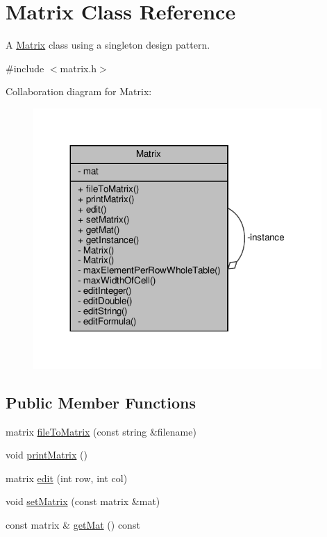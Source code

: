 \hypertarget{class_matrix}{}\section{Matrix Class Reference}
\label{class_matrix}


A \hyperlink{class_matrix}{Matrix} class using a singleton design pattern.  




{\ttfamily \#include $<$matrix.\+h$>$}



Collaboration diagram for Matrix\+:\nopagebreak
\begin{figure}[H]
\begin{center}
\leavevmode
\includegraphics[width=311pt]{class_matrix__coll__graph}
\end{center}
\end{figure}
\subsection*{Public Member Functions}
\begin{DoxyCompactItemize}
\item 
matrix \hyperlink{class_matrix_a35eb9dcb01c552fea1f5926db35339ef}{file\+To\+Matrix} (const string \&filename)
\item 
void \hyperlink{class_matrix_aa1967ad240a5ffaf492800044b7275d9}{print\+Matrix} ()
\item 
matrix \hyperlink{class_matrix_a34b2269a2b6d06c202439de2e64009ba}{edit} (int row, int col)
\item 
void \hyperlink{class_matrix_a8c45dd1354fa25e14065cab23f3074c0}{set\+Matrix} (const matrix \&mat)
\item 
const matrix \& \hyperlink{class_matrix_a52d82641f52304c9b6525747cd7f960c}{get\+Mat} () const
\end{DoxyCompactItemize}
